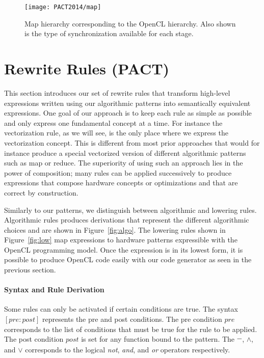 \begin{figure}[t]
\centering
\texttt{[image: PACT2014/map]}
\caption{Map hierarchy corresponding to the OpenCL hierarchy. Also shown is the type of synchronization available for each stage.}
\label{fig:map}
\end{figure}


\section{Rewrite Rules (PACT)}

This section introduces our set of rewrite rules that transform high-level expressions written using our algorithmic patterns into semantically equivalent expressions.
One goal of our approach is to keep each rule as simple as possible and only express one fundamental concept at a time.
For instance the vectorization rule, as we will see, is the only place where we express the vectorization concept.
This is different from most prior approaches that would for instance produce a special vectorized version of different algorithmic patterns such as map or reduce.
The superiority of using such an approach lies in the power of composition;
many rules can be applied successively to produce expressions that compose hardware concepts or optimizations and that are correct by construction.

Similarly to our patterns, we distinguish between algorithmic and lowering rules.
Algorithmic rules produces derivations that represent the different algorithmic choices and are shown in Figure~\ref{fig:algo}.
The lowering rules shown in Figure~\ref{fig:low} map expressions to hardware patterns expressible with the OpenCL programming model.
Once the expression is in its lowest form, it is possible to produce OpenCL code easily with our code generator as seen in the previous section.


\paragraph{Syntax and Rule Derivation}
Some rules can only be activated if certain conditions are true.
The syntax $[pre:post]$ represents the pre and post conditions.
The pre condition $pre$ corresponds to the list of conditions that must be true for the rule to be applied.
The post condition $post$ is set for any function bound to the pattern.
The $\overline{\rule[-.3\baselineskip]{0pt}{1.5ex}\hspace{1.5ex}}$, $\wedge$, and $\vee$ corresponds to the logical \emph{not}, \emph{and}, and \emph{or} operators respectively.

